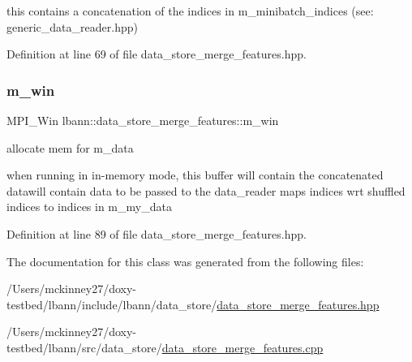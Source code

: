 this contains a concatenation of the indices in m\+\_\+minibatch\+\_\+indices (see\+: generic\+\_\+data\+\_\+reader.\+hpp) 

Definition at line 69 of file data\+\_\+store\+\_\+merge\+\_\+features.\+hpp.

\mbox{\label{classlbann_1_1data__store__merge__features_a98f2c892955666c136ea4bb8aeba5e2b}} 
\subsubsection{\texorpdfstring{m\+\_\+win}{m\_win}}
{\footnotesize\ttfamily M\+P\+I\+\_\+\+Win lbann\+::data\+\_\+store\+\_\+merge\+\_\+features\+::m\+\_\+win\hspace{0.3cm}{\ttfamily [protected]}}



allocate mem for m\+\_\+data 

when running in in-\/memory mode, this buffer will contain the concatenated datawill contain data to be passed to the data\+\_\+reader maps indices wrt shuffled indices to indices in m\+\_\+my\+\_\+data 

Definition at line 89 of file data\+\_\+store\+\_\+merge\+\_\+features.\+hpp.



The documentation for this class was generated from the following files\+:\begin{DoxyCompactItemize}
\item 
/\+Users/mckinney27/doxy-\/testbed/lbann/include/lbann/data\+\_\+store/\hyperlink{data__store__merge__features_8hpp}{data\+\_\+store\+\_\+merge\+\_\+features.\+hpp}\item 
/\+Users/mckinney27/doxy-\/testbed/lbann/src/data\+\_\+store/\hyperlink{data__store__merge__features_8cpp}{data\+\_\+store\+\_\+merge\+\_\+features.\+cpp}\end{DoxyCompactItemize}
